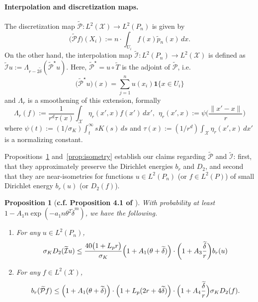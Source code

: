 \documentclass[twoside]{article}
\newcommand{\1}{\mathbf{1}}
\newcommand{\Xset}{\mathcal{X}}
\newcommand{\Leb}{L}
\newcommand{\mc}[1]{\mathcal{#1}}
\newcommand{\wt}[1]{\widetilde{#1}}
\newtheorem{proposition}{Proposition}
\theoremstyle{definition}
\theoremstyle{remark}
\begin{document}
\paragraph{Interpolation and discretization maps.}

The discretization map  $\wt{\mathcal{P}}: \Leb^2(\Xset) \to \Leb^2(P_n)$ is given by
\begin{equation*}
\bigl(\wt{\mathcal{P}}f\bigr)(X_i) := n \cdot \int_{U_i} f(x) \wt{p}_n(x) \,dx.
\end{equation*}
On the other hand, the interpolation map $\wt{\mc{I}}: \Leb^2(P_n) \to \Leb^2(\Xset)$ is defined as $\wt{\mc{I}}u := \Lambda_{r - 2\wt{\delta}}(\wt{\mc{P}}^{\star}u)$. Here, $\wt{\mc{P}}^{\star} = u \circ \wt{T}$ is the adjoint of $\wt{\mc{P}}$, i.e.
\begin{equation*}
\bigl(\wt{\mc{P}}^{\star}u\bigr)(x) = \sum_{j = 1}^{n} u(x_i) \1\{x \in U_i\} 
\end{equation*} 
and $\Lambda_r$ is a smoothening of this extension, formally
\begin{equation*}
\Lambda_r(f) := \frac{1}{r^d\tau(x)}\int_{\Xset} \eta_r(x',x) f(x') \,dx',~~ \eta_r(x',x) := \psi\biggl(\frac{\|x' - x\|}{r}\biggr)
\end{equation*}
where $\psi(t) := (1/\sigma_K)\int_{t}^{\infty} s K(s) \,ds$ and $\tau(x) := (1/r^d)\int_{\Xset} \eta_r(x',x) \,dx'$ is a normalizing constant.

Propositions~\ref{prop:dirichlet_energies} and~\ref{prop:isometry} establish our claims regarding $\wt{\mc{P}}$ and $\wt{\mc{I}}$: first, that they approximately preserve the Dirichlet energies $b_r$ and $D_2$, and second that they are near-isometries for functions $u \in \Leb^2(P_n)$ (or $f \in \Leb^2(P)$) of small Dirichlet energy $b_r(u)$ (or $D_2(f)$).

\begin{proposition}[\textbf{c.f. Proposition 4.1 of \citet{calder2019}}]
	\label{prop:dirichlet_energies}
	With probability at least $1 - A_1n\exp(-a_1n\theta^2\wt{\delta}^{m})$, we have the following.
	\begin{enumerate}[(1)]
		\item For any $u \in \Leb^2(P_n)$,
		\begin{equation*}
		\sigma_{K} D_2(\wt{\mc{I}}u) \leq \frac{40 \bigl(1 + L_p r\bigr)}{\sigma_K} \Bigl(1 + A_1(\theta + \wt{\delta})\Bigr) \cdot \biggl(1 + A_3\frac{\wt{\delta}}{r}\biggr) b_r(u)
		\end{equation*}
		\item For any $f \in \Leb^2(\Xset)$,
		\begin{equation*}
		b_r(\wt{\mc{P}}f) \leq \Bigl(1 + A_1(\theta + \wt{\delta})\Bigr) \cdot \Bigl(1 + L_p(2r + 4\wt{\delta})\Bigr) \cdot \Bigl(1 + A_4\frac{\wt{\delta}}{r}\Bigr) \sigma_{K} D_2(f).
		\end{equation*}
	\end{enumerate}
\end{proposition}
\end{document}
